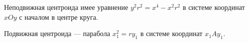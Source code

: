 Неподвижная центроида имее уравнение $y^2r^2 = x^4 - x^2r^2$
в системе координат $xOy$ с началом в центре круга.

Подвижная центроида --- парабола $x^2_1 = ry_1$ в системе координат $x_1Ay_1$.
